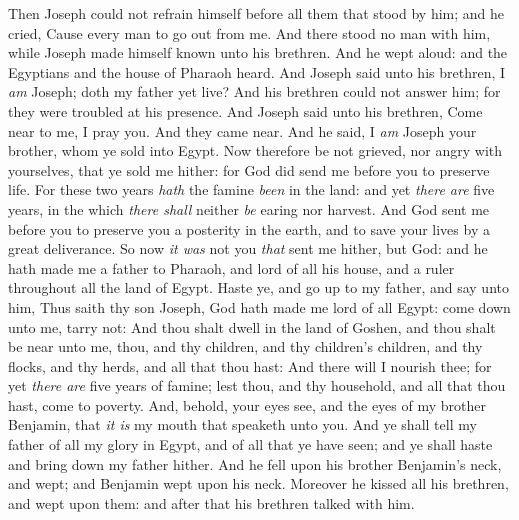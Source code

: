 \documentclass[11pt,letterpaper,oneside]{memoir}
\begin{document}
Then Joseph could not refrain himself before all them that stood by him;
and he cried, Cause every man to go out from me. And there stood no man
with him, while Joseph made himself known unto his brethren. And he wept
aloud: and the Egyptians and the house of Pharaoh heard. And Joseph said
unto his brethren, I \emph{am} Joseph; doth my father yet live? And his
brethren could not answer him; for they were troubled at his presence.
And Joseph said unto his brethren, Come near to me, I pray you. And they
came near. And he said, I \emph{am} Joseph your brother, whom ye sold
into Egypt. Now therefore be not grieved, nor angry with yourselves,
that ye sold me hither: for God did send me before you to preserve life.
For these two years \emph{hath} the famine \emph{been} in the land: and
yet \emph{there are} five years, in the which \emph{there shall} neither
\emph{be} earing nor harvest. And God sent me before you to preserve you
a posterity in the earth, and to save your lives by a great deliverance.
So now \emph{it was} not you \emph{that} sent me hither, but God: and he
hath made me a father to Pharaoh, and lord of all his house, and a ruler
throughout all the land of Egypt. Haste ye, and go up to my father, and
say unto him, Thus saith thy son Joseph, God hath made me lord of all
Egypt: come down unto me, tarry not: And thou shalt dwell in the land of
Goshen, and thou shalt be near unto me, thou, and thy children, and thy
children's children, and thy flocks, and thy herds, and all that thou
hast: And there will I nourish thee; for yet \emph{there are} five years
of famine; lest thou, and thy household, and all that thou hast, come to
poverty. And, behold, your eyes see, and the eyes of my brother
Benjamin, that \emph{it is} my mouth that speaketh unto you. And ye
shall tell my father of all my glory in Egypt, and of all that ye have
seen; and ye shall haste and bring down my father hither. And he fell
upon his brother Benjamin's neck, and wept; and Benjamin wept upon his
neck. Moreover he kissed all his brethren, and wept upon them: and after
that his brethren talked with him.
\end{document}
